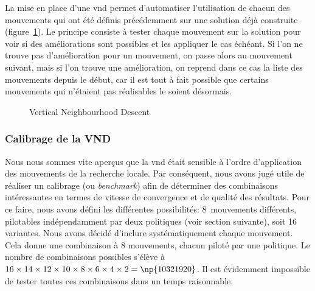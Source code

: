 			La mise en place d'une \acrlong{vnd} permet d'automatiser l'utilisation de chacun des mouvements qui ont été définis précédemment sur une solution déjà construite (figure~\ref{uml:vnd}). Le principe consiste à tester chaque mouvement sur la solution pour voir si des améliorations sont possibles et les appliquer le cas échéant. Si l'on ne trouve pas d'amélioration pour un mouvement, on passe alors au mouvement suivant, mais si l'on trouve une amélioration, on reprend dans ce cas la liste des mouvements depuis le début, car il est tout à fait possible que certains mouvements qui n'étaient pas réalisables le soient désormais. 
			
			\begin{figure}[h!]
				\centering
				\begin{tikzpicture}
					
				\end{tikzpicture}
				\caption[UML -- VND]{Vertical Neighbourhood Descent}
				\label{uml:vnd}
			\end{figure}

			\begin{code}
				\begin{algo}[informal]
					\VAR
					\ENDVAR
					\BEGIN
						\REPEAT
							\ELSE
							\ENDIF
					\END
				\end{algo}
			\end{code}
			
			\subsubsection{Calibrage de la VND}
				Nous nous sommes vite aperçus que la \acrshort{vnd} était sensible à l'ordre d'application des mouvements de la recherche locale. Par conséquent, nous avons jugé utile de réaliser un calibrage (ou \emph{benchmark}) afin de déterminer des combinaisons intéressantes en termes de vitesse de convergence et de qualité des résultats. Pour ce faire, nous avons défini les différentes possibilités: 8~mouvements différents, pilotables indépendamment par deux politiques (voir section suivante), soit 16 variantes. Nous avons décidé d'inclure systématiquement chaque mouvement. Cela donne une combinaison à 8 mouvements, chacun piloté par une politique. Le nombre de combinaisons possibles s'élève à $16 \times 14 \times 12 \times 10 \times 8 \times 6 \times 4 \times 2 = \np{10321920}$. Il est évidemment impossible de tester toutes ces combinaisons dans un temps raisonnable.

